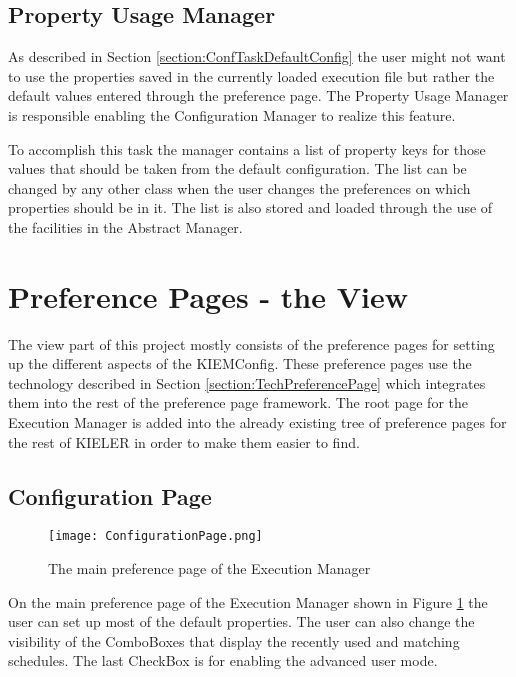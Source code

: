 \subsection{Property Usage Manager}
\label{section:Property Usage Manager}
As described in Section \ref{section:ConfTaskDefaultConfig} the user might not want to use
the properties saved in the currently loaded execution file but rather the default values
entered through the preference page. The Property Usage Manager is responsible enabling
the Configuration Manager to realize this feature.

To accomplish this task the manager contains a list of property keys for those values
that should be taken from the default configuration. The list can be changed by any other
class when the user changes the preferences on which properties should be in it. The list
is also stored and loaded through the use of the facilities in the Abstract Manager.


\section{Preference Pages - the View}
\label{section:ConfView}
The view part of this project mostly consists of the preference pages for setting up the different
aspects of the \ac{KIEMConfig}. These preference pages use the technology described in Section
\ref{section:TechPreferencePage} which integrates them into the rest of the preference page
framework. The root page for the Execution Manager is added into the already existing tree
of preference pages for the rest of \ac{KIELER} in order to make them easier to find.

\subsection{Configuration Page}
\label{section:ConfigurationPage}
\begin{figure}
  \centering
  \texttt{[image: ConfigurationPage.png]}
  \caption[The main preference page of the Execution Manager]%
  {The main preference page of the Execution Manager\protect}
  \label{fig:ConfigurationPage}
\end{figure}
On the main preference page of the Execution Manager shown in Figure \ref{fig:ConfigurationPage} the user can
set up most of the default properties. The user can also change the visibility of the ComboBoxes that display
the recently used and matching schedules. The last CheckBox is for enabling the advanced user mode.

